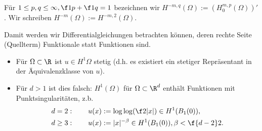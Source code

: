 \begin{df} \label{3.11}
	Für $1 \le p, q \le \infty, \f 1p + \f 1q = 1$ bezeichnen wir $H^{-m,q}(\Omega) := (H_0^{m,p}(\Omega))'$.
	Wir schreiben $H^{-m}(\Omega) := H^{-m, 2}(\Omega)$.
	\begin{note}
		Damit werden wir Differentialgleichungen betrachten können, deren rechte Seite (Quellterm) Funktionale statt Funktionen sind.
	\end{note}
\end{df}

\begin{note}[Stetigkeit für $d = 1$]
	\begin{itemize}
		\item
			Für $\Omega \subset \R$ ist $u \in H^1{\Omega}$ stetig (d.h. es existiert ein stetiger Repräsentant in der Äquivalenzklasse von $u$).
		\item
			Für $d > 1$ ist dies falsch: $H^1(\Omega)$ für $\Omega \subset \R^d$ enthält Funktionen mit Punktsingularitäten, z.b.
			\begin{align*}
				d = 2: \qquad u(x) &:= \log \log(\f 2{|x|}) \in H^1(B_1(0)), \\
				d \ge 3: \qquad u(x) &:= |x|^{-\beta} \in H^1(B_1(0)), \beta < \f{d-2}2.
			\end{align*}
	\end{itemize}
\end{note}

